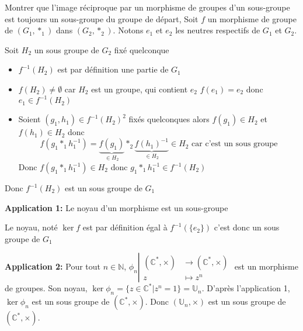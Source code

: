 \documentclass{article}
\begin{document}
\begin{question_kholle}{Montrer que l'image réciproque par un morphisme de groupes d'un sous-groupe est toujours un sous-groupe du groupe de départ, }
	Soit $f$ un morphisme de groupe de $(G_{1},*_{1})$ dans $(G_{2}, *_{2})$. Notons $e_{1}$ et $e_{2}$ les neutres respectifs de $G_{1}$ et $G_{2}$.

	Soit $H_{2}$ un sous groupe de $G_{2}$ fixé quelconque
	\begin{itemize}[label=$\star$]
		\item $f^{-1}(H_{2})$ est par définition une partie de $G_{1}$
		\item $f(H_{2}) \neq \emptyset$ car $H_{2}$ est un groupe, qui contient $e_{2}$ $f(e_{1}) = e_{2}$ donc $e_{1} \in f^{-1}(H_{2})$
		\item Soient $(g_{1},h_{1}) \in f^{-1}(H_{2})^{2}$ fixés quelconques
		      alors $f(g_{1}) \in H_{2}$ et $f(h_{1}) \in H_{2}$
		      donc
		      $$
			      f(g_{1} *_{1} h_{1}^{-1}) = \underbrace{ f(g_{1}) }_{ \in H_{2} }*_{2}\underbrace{ f(h_{1})^{-1} }_{ \in H_{2} } \in H_{2} \text{ car c'est un sous groupe}$$
		      Donc $f(g_{1} *_{1} h_{1}^{-1}) \in H_{2}$ donc $g_{1} *_{1} h_{1}^{-1} \in f^{-1}(H_{2})$
	\end{itemize}
	Donc $f^{-1}(H_{2})$ est un sous groupe de $G_{1}$
\end{question_kholle}

\textbf{Application 1:} Le noyau d'un morphisme est un sous-groupe

Le noyau, noté $\ker f$ est par définition égal à $f^{-1}(\{e_2\})$ c'est donc un sous groupe de $G_1$

\textbf{Application 2:} Pour tout $n \in \mathbb{N}$, $\phi _{n}\left|\begin{array}{ll} (\mathbb{C}^{*},\times) &\to (\mathbb{C}^{*},\times) \\ z &\mapsto z^{n} \end{array}\right.$ est un morphisme de groupes. Son noyau, $\ker \phi _n = \{ z \in \mathbb{C}^{*} | z^{n} = 1 \} = \mathbb{U}_{n}$. D'après l'application 1, $\ker \phi_{n}$ est un sous groupe de $(\mathbb{C}^{*}, \times)$. Donc $(\mathbb{U}_{n}, \times)$ est un sous groupe de $(\mathbb{C}^{*},\times)$.
\end{document}
